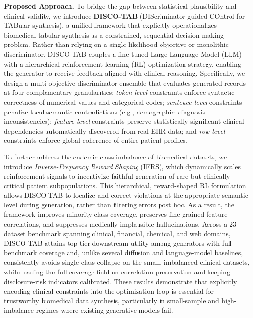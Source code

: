 \noindent\textbf{Proposed Approach.}
To bridge the gap between statistical plausibility and clinical validity, we introduce \textbf{DISCO-TAB} (DIScriminator-guided COntrol for TABular synthesis), a unified framework that explicitly operationalizes biomedical tabular synthesis as a constrained, sequential decision-making problem. Rather than relying on a single likelihood objective or monolithic discriminator, DISCO-TAB couples a fine-tuned Large Language Model (LLM) with a hierarchical reinforcement learning (RL) optimization strategy, enabling the generator to receive  feedback aligned with clinical reasoning. Specifically, we design a multi-objective discriminator ensemble that evaluates generated records at four complementary granularities: \emph{token-level} constraints enforce syntactic correctness of numerical values and categorical codes; \emph{sentence-level} constraints penalize local semantic contradictions (e.g., demographic--diagnosis inconsistencies); \emph{feature-level} constraints preserve statistically significant clinical dependencies automatically discovered from real EHR data; and \emph{row-level} constraints enforce global coherence of entire patient profiles. 

To further address the endemic class imbalance of biomedical datasets, we introduce \emph{Inverse-Frequency Reward Shaping} (IFRS), which dynamically scales reinforcement signals to incentivize faithful generation of rare but clinically critical patient subpopulations. This hierarchical, reward-shaped RL formulation allows DISCO-TAB to localize and correct violations at the appropriate semantic level during generation, rather than filtering errors post hoc. As a result, the framework improves minority-class coverage, preserves fine-grained feature correlations, and suppresses medically implausible hallucinations. Across a 23-dataset benchmark spanning clinical, financial, chemical, and web domains, DISCO-TAB attains top-tier downstream utility among generators with full benchmark coverage and, unlike several diffusion and language-model baselines, consistently avoids single-class collapse on the small, imbalanced clinical datasets, while leading the full-coverage field on correlation preservation and keeping disclosure-risk indicators calibrated.
These results demonstrate that explicitly encoding clinical constraints into the optimization loop is essential for trustworthy biomedical data synthesis, particularly in small-sample and high-imbalance regimes where existing generative models fail.



